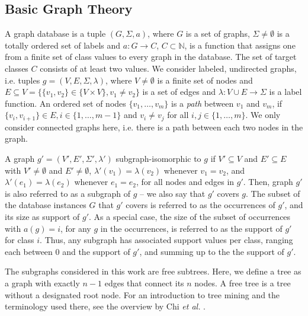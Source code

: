 \documentclass{sig-alternate}
\begin{document}
\subsection{Basic Graph Theory}
\label{ss:BasicGraphTheory}
A graph database is a tuple $(G, \Sigma, a)$, where $G$ is a set of graphs,
$\Sigma \ne \emptyset$  is a totally ordered set of labels and $a: G
\rightarrow C$, $C \subset \mathbb{N}$, is a function that assigns one from a
finite set of class values to every graph in the database.  The set of target
classes $C$ consists of at least two values.  We consider labeled, undirected
graphs, i.e. tuples $g=(V,E,\Sigma,\lambda)$, where $V\ne \emptyset$ is a
finite set of nodes and $E \subseteq V = \{\{v_1, v_2\} \in \{V \times V\}, v_1
\ne v_2\}$ is a set of edges and $\lambda: V\cup E \rightarrow \Sigma$ is a
label function.  
An ordered set of nodes $\{ v_1, \ldots, v_m\}$ is a \emph{path} between $v_1$ and $v_m$, if $\{v_i, v_{i+1}\} \in E, i \in \{1,\ldots,m-1\}$ and $v_i \neq v_j$ for all $i,j\in \{1,\ldots,m\}$.
We only consider connected graphs here, i.e.  there is a path
between each two nodes in the graph.

A graph $g'=(V',E',\Sigma',\lambda')$ subgraph-isomorphic to $g$ if $V'
\subseteq V$ and $E' \subseteq E$ with $V' \ne \emptyset$ and $E' \ne
\emptyset$, $\lambda'(v_1)=\lambda(v_2)$ whenever $v_1=v_2$, and
$\lambda'(e_1)=\lambda(e_2)$ whenever $e_1=e_2$, for all nodes and edges in
$g'$. Then, graph $g'$ is also referred to as a subgraph of $g$ -- we also say
that $g'$ covers $g$.  The subset of the database instances $G$ that $g'$
covers is referred to as the occurrences of $g'$, and its size as support of
$g'$.  As a special case, the size of the subset of occurrences with $a(g)=i$,
for any $g$ in the occurrences, is referred to as the support of $g'$ for class
$i$. Thus, any subgraph has associated support values per class, ranging each
between 0 and the support of $g'$, and summing up to the the support of $g'$.

The subgraphs considered in this work are free subtrees. Here, we define a tree
as a graph with exactly $n-1$ edges that connect its $n$ nodes. A free tree is
a tree without a designated root node. For an introduction to tree mining and
the terminology used there, see the overview by Chi \emph{et al.}
\cite{CMNK01Frequent}.
\end{document}
